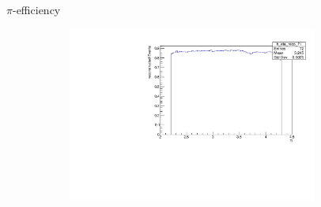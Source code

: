\documentclass[11pt]{beamer}
\begin{document}
\begin{frame}{$\pi$-efficiency}
\begin{figure}
\begin{subfigure}{0.45\textwidth}
\end{subfigure}
\begin{subfigure}{0.45\textwidth}
\includegraphics[width=0.9\textwidth]{up_pdf/h_eta_reco_Pi.pdf}
\end{subfigure}
\end{figure}
\end{frame}
\end{document}
